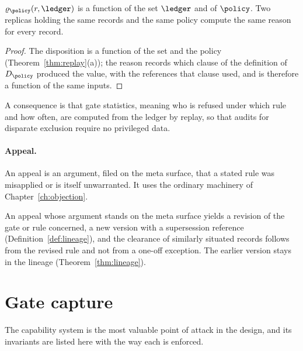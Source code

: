 \begin{proposition}\label{prop:reasondet}
$\varrho_\policy(r,\ledger)$ is a function of the set $\ledger$ and of $\policy$. Two replicas holding the same records and the same policy compute the same reason for every record.
\end{proposition}

\begin{proof}
The disposition is a function of the set and the policy (Theorem~\ref{thm:replay}(a)); the reason records which clause of the definition of $D_\policy$ produced the value, with the references that clause used, and is therefore a function of the same inputs.
\end{proof}

A consequence is that gate statistics, meaning who is refused under which rule and how often, are computed from the ledger by replay, so that audits for disparate exclusion require no privileged data.

\paragraph{Appeal.} An appeal is an argument, filed on the meta surface, that a stated rule was misapplied or is itself unwarranted. It uses the ordinary machinery of Chapter~\ref{ch:objection}.

\begin{designrule}\label{rule:appeal}
An appeal whose argument stands on the meta surface yields a revision of the gate or rule concerned, a new version with a supersession reference (Definition~\ref{def:lineage}), and the clearance of similarly situated records follows from the revised rule and not from a one-off exception. The earlier version stays in the lineage (Theorem~\ref{thm:lineage}).
\end{designrule}

\section{Gate capture}\label{sec:capture}

The capability system is the most valuable point of attack in the design, and its invariants are listed here with the way each is enforced.


